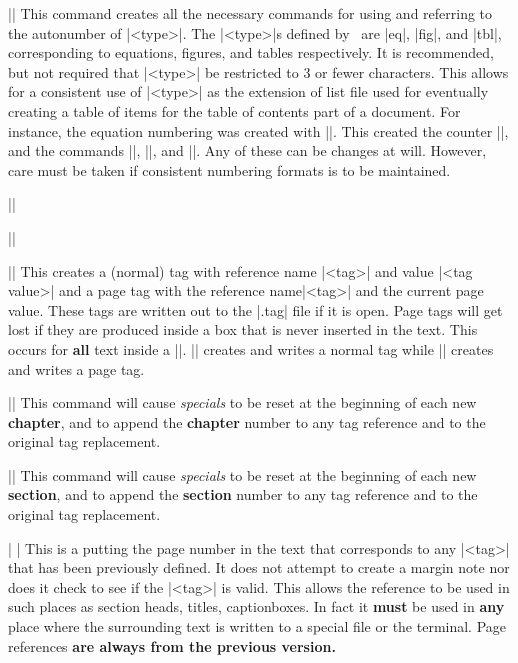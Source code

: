 \mbr
\ext\@||
\nbr
This command creates all the necessary commands for using and referring to
the autonumber of |<type>|. The |<type>|s defined by \intex\ are |eq|, |fig|,
and |tbl|, corresponding to equations, figures, and tables respectively. It
is recommended, but not required that |<type>| be restricted to 3 or fewer
characters. This allows for a consistent use of |<type>| as the extension of
list file used for eventually creating a table of items for the table of
contents part of a document. 
For instance, the equation numbering was created with ||. This
created the counter |\eqnum|, and the
commands |\eqnumform|, |\eqtagreplaceformat|, and |\eqtagrefformat|. Any of
these can be changes at will. However, care must be taken if consistent
numbering formats is to be maintained. 

\mbr
\ext\@||

\ext\@||

\ext\@||
\nbr
This creates a (normal) tag with reference name |<tag>| and value 
|<tag value>| and a page tag with the reference name|<tag>| and the current
page value. These
tags are written out to the |.tag| file if it is open. Page tags will get
lost if they are produced inside a box that is never inserted in the text.
This occurs for {\bf all} text inside a ||.
|| creates and writes a normal tag while 
|| creates and writes a page tag. 

\mbr
\ext\@|\numberbychapter|
\nbr
This command will cause {\it specials} to be reset at the beginning of each
new {\bf chapter}, and to append the {\bf chapter} number to any tag reference and to the
original tag replacement.

\mbr
\ext\@|\numberbysection|
\nbr
This command will cause {\it specials} to be reset at the beginning of each
new {\bf section}, and to append the {\bf section} number to any tag reference and to the
original tag replacement.


\mbr
\ext\@| |
\nbr
This is a putting the page number in the text that corresponds to any
|<tag>| 
that has been previously
defined. It does not attempt to create a margin note nor does it
check to see if the |<tag>| is valid. This allows the 
reference to be used in such places as section heads, titles, captionboxes. 
In fact it {\bf must} be used in {\bf any}  place where the surrounding text is
written to a special file or the terminal. 
Page references {\bf are always from the previous version.}


